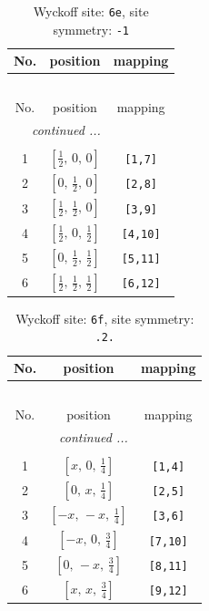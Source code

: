 \documentclass[fleqn,8pt]{jsarticle}
\begin{document}
\renewcommand{\arraystretch}{1.2}
\begin{longtable}{ccc}
\caption{Wyckoff site: {\tt 6e}, site symmetry: {\tt -1}}
 \\
 \hline \hline
No. & position & mapping \\ \hline \endfirsthead

\multicolumn{2}{l}{\tablename\ \thetable{}} \\
 \hline \hline
No. & position & mapping \\ \hline \endhead

 \hline \hline
\multicolumn{2}{r}{\footnotesize\it continued ...} \\ \endfoot

 \hline \hline
\multicolumn{2}{r}{} \\ \endlastfoot

1 & $\left[ \frac{1}{2},\, 0,\, 0 \right]$ & {\tt [1,7]} \\ \hline
2 & $\left[ 0,\, \frac{1}{2},\, 0 \right]$ & {\tt [2,8]} \\ \hline
3 & $\left[ \frac{1}{2},\, \frac{1}{2},\, 0 \right]$ & {\tt [3,9]} \\ \hline
4 & $\left[ \frac{1}{2},\, 0,\, \frac{1}{2} \right]$ & {\tt [4,10]} \\ \hline
5 & $\left[ 0,\, \frac{1}{2},\, \frac{1}{2} \right]$ & {\tt [5,11]} \\ \hline
6 & $\left[ \frac{1}{2},\, \frac{1}{2},\, \frac{1}{2} \right]$ & {\tt [6,12]} \\
\end{longtable}
\renewcommand{\arraystretch}{1.2}
\begin{longtable}{ccc}
\caption{Wyckoff site: {\tt 6f}, site symmetry: {\tt .2.}}
 \\
 \hline \hline
No. & position & mapping \\ \hline \endfirsthead

\multicolumn{2}{l}{\tablename\ \thetable{}} \\
 \hline \hline
No. & position & mapping \\ \hline \endhead

 \hline \hline
\multicolumn{2}{r}{\footnotesize\it continued ...} \\ \endfoot

 \hline \hline
\multicolumn{2}{r}{} \\ \endlastfoot

1 & $\left[ x,\, 0,\, \frac{1}{4} \right]$ & {\tt [1,4]} \\ \hline
2 & $\left[ 0,\, x,\, \frac{1}{4} \right]$ & {\tt [2,5]} \\ \hline
3 & $\left[ - x,\, - x,\, \frac{1}{4} \right]$ & {\tt [3,6]} \\ \hline
4 & $\left[ - x,\, 0,\, \frac{3}{4} \right]$ & {\tt [7,10]} \\ \hline
5 & $\left[ 0,\, - x,\, \frac{3}{4} \right]$ & {\tt [8,11]} \\ \hline
6 & $\left[ x,\, x,\, \frac{3}{4} \right]$ & {\tt [9,12]} \\
\end{longtable}
\end{document}

